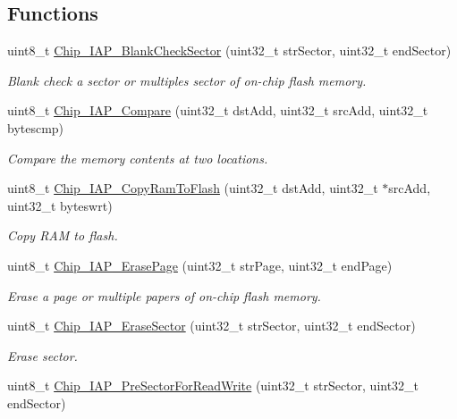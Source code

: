 \subsection*{Functions}
\begin{DoxyCompactItemize}
\item 
uint8\+\_\+t \hyperlink{group__COMMON__IAP_ga98c7e657a618cf004a8967112dae1a30}{Chip\+\_\+\+I\+A\+P\+\_\+\+Blank\+Check\+Sector} (uint32\+\_\+t str\+Sector, uint32\+\_\+t end\+Sector)
\begin{DoxyCompactList}\small\item\em Blank check a sector or multiples sector of on-\/chip flash memory. \end{DoxyCompactList}\item 
uint8\+\_\+t \hyperlink{group__COMMON__IAP_ga0f3983319210f99d1931f1e9fa762d9e}{Chip\+\_\+\+I\+A\+P\+\_\+\+Compare} (uint32\+\_\+t dst\+Add, uint32\+\_\+t src\+Add, uint32\+\_\+t bytescmp)
\begin{DoxyCompactList}\small\item\em Compare the memory contents at two locations. \end{DoxyCompactList}\item 
uint8\+\_\+t \hyperlink{group__COMMON__IAP_ga71cb8cde86dc344b05219cdf1ecee638}{Chip\+\_\+\+I\+A\+P\+\_\+\+Copy\+Ram\+To\+Flash} (uint32\+\_\+t dst\+Add, uint32\+\_\+t $\ast$src\+Add, uint32\+\_\+t byteswrt)
\begin{DoxyCompactList}\small\item\em Copy R\+AM to flash. \end{DoxyCompactList}\item 
uint8\+\_\+t \hyperlink{group__COMMON__IAP_ga95ca28fb39884184657054e134671f95}{Chip\+\_\+\+I\+A\+P\+\_\+\+Erase\+Page} (uint32\+\_\+t str\+Page, uint32\+\_\+t end\+Page)
\begin{DoxyCompactList}\small\item\em Erase a page or multiple papers of on-\/chip flash memory. \end{DoxyCompactList}\item 
uint8\+\_\+t \hyperlink{group__COMMON__IAP_ga02dbb90a49e24dc449d45a66f03a4a2d}{Chip\+\_\+\+I\+A\+P\+\_\+\+Erase\+Sector} (uint32\+\_\+t str\+Sector, uint32\+\_\+t end\+Sector)
\begin{DoxyCompactList}\small\item\em Erase sector. \end{DoxyCompactList}\item 
uint8\+\_\+t \hyperlink{group__COMMON__IAP_gac45b60745e55670c7fa806e2865625c4}{Chip\+\_\+\+I\+A\+P\+\_\+\+Pre\+Sector\+For\+Read\+Write} (uint32\+\_\+t str\+Sector, uint32\+\_\+t end\+Sector)

\end{DoxyCompactItemize}
